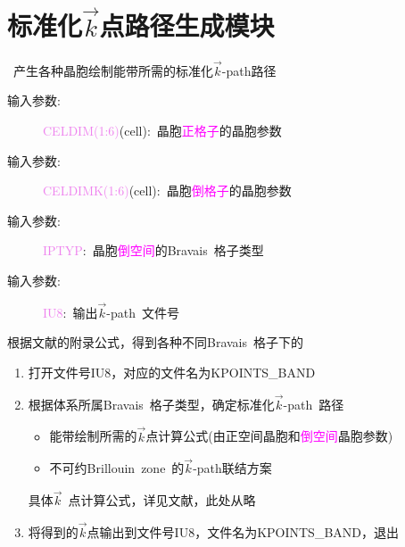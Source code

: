\documentclass{article}      %
\begin{document}
\section{标准化$\vec k$点路径生成模块}
~产生各种晶胞绘制能带所需的标准化$\vec k$-\textrm{path}路径
\begin{description}
	\item[输入参数:~]\textcolor{violet}{\textrm{CELDIM(1:6)}}(\textrm{cell}):~晶胞\textcolor{magenta}{正格子}的晶胞参数
	\item[输入参数:~]\textcolor{violet}{\textrm{CELDIMK(1:6)}}(\textrm{cell}):~晶胞\textcolor{magenta}{倒格子}的晶胞参数
	\item[输入参数:~]\textcolor{violet}{\textrm{IPTYP}}:~晶胞\textcolor{magenta}{倒空间}的\textrm{Bravais~}格子类型
	\item[输入参数:~]\textcolor{violet}{\textrm{IU8}}:~输出$\vec k$-\textrm{path}~文件号
\end{description}
根据文献\cite{CMS49-299_2010}的附录公式，得到各种不同\textrm{Bravais~}格子下的
\begin{enumerate}
	\item 打开文件号\textrm{IU8}，对应的文件名为\textrm{KPOINTS\_BAND}
	\item 根据体系所属\textrm{Bravais~}格子类型，确定标准化$\vec k$-\textrm{path}~路径
\begin{itemize}
	\item 能带绘制所需的$\vec k$点计算公式(由\textcolor{matgen}{正空间}晶胞和\textcolor{magenta}{倒空间}晶胞参数)
	\item 不可约\textrm{Brillouin~zone}~的$\vec k$-\textrm{path}联结方案
\end{itemize}
具体$\vec k$~点计算公式，详见文献\cite{CMS49-299_2010}，此处从略
	\item 将得到的$\vec k$点输出到文件号\textrm{IU8}，文件名为\textrm{KPOINTS\_BAND}，退出
\end{enumerate}

\end{document}
